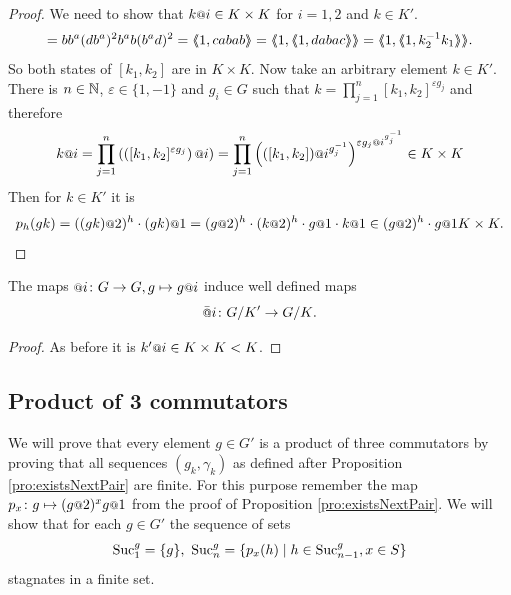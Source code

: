 \documentclass[a4paper,11pt]{amsart}
\begin{document}
\begin{proof}
We need to show that $k\at{i} \in K\times K$ for $i=1,2$ and $k\in K'$. 
\begin{align*}
 [k_1,k_2]=bb^a(db^a)^2b^ab(b^ad)^2 = \pair{1,cabab}=\pair{1,\pair{1,dabac}}=\pair{1,\pair{1,k_2^{-1}k_1}}.
\end{align*}
So both states of $[k_1,k_2]$ are in $K\times K$. Now take an arbitrary element $k\in K'$.
There is $n\in\mathbb{N}$, $\varepsilon \in \{1,-1\}$ and $g_i\in G$ such that 
$k=\prod_{j=1}^n [k_1,k_2]^{\varepsilon g_j}$
and therefore 
\[k\at{i}=\prod_{j=1}^n\left( \left([k_1,k_2]^{\varepsilon g_j}\right)\at{i}\right)
	 = \prod_{j=1}^n \left(([k_1,k_2])\at{i^{g_j^{-1}}}\right)^{\varepsilon g_j\at{i^{g_j^{-1}}}}\in K\times K\]
 Then for $k\in K'$ it is 
 \[p_h(gk) = ((gk)\at{2})^h\cdot (gk)\at{1} = (g\at{2})^h\cdot (k\at{2})^h\cdot g\at{1}\cdot k\at{1}\in (g\at{2})^h\cdot g\at{1}K\times K.\]
\end{proof}
\begin{lem} \label{lem:atIsWellDefinedModK'}
 The maps $\at{i}\colon G\to G, g\mapsto g\at{i}$ induce well defined maps \[\att{i}\colon \RNK{G}{K'}\to\RNK{G}{K}.\]
\end{lem}
\begin{proof}
 As before it is $k'\at{i} \in K\times K < K$.
%  
%  
% 
\end{proof}
\subsection{Product of 3 commutators}
We will prove that every element $g\in G'$ is a product of three commutators by proving that all
sequences $(g_k,\gamma_k)$ as defined after Proposition \ref{pro:existsNextPair} are finite.
For this purpose remember the map $p_x\colon g \mapsto (g\at{2})^x g\at{1}$ from the proof of Proposition \ref{pro:existsNextPair}.
We will show that for each $g\in G'$ the sequence of sets 
\[\textup{Suc}_1^g=\{g\},\ \textup{Suc}_n^g = \{p_x(h) \mid h\in \textup{Suc}_{n-1}^g, x\in S\} \]
stagnates in a finite set. 
\end{document}
